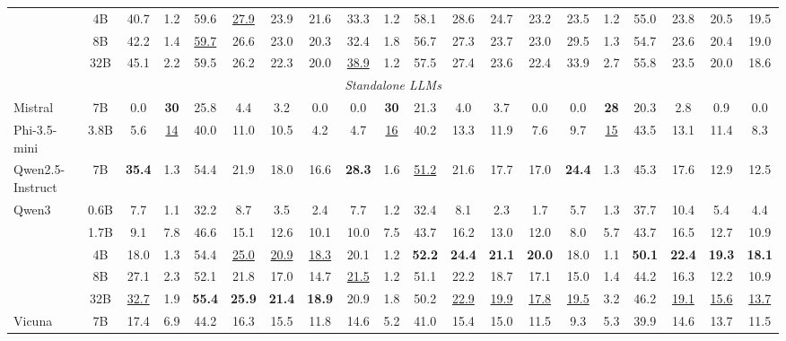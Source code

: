 \begin{table}[t]
{\begin{tabular}{lc|cccccc|cccccc|cccccc}
 & 4B & 40.7 & 1.2 & 59.6 & \underline{27.9} & 23.9 & 21.6 & 33.3 & 1.2 & 58.1 & 28.6 & 24.7 & 23.2 & 23.5 & 1.2 & 55.0 & 23.8 & 20.5 & 19.5 \\
 & 8B & 42.2 & 1.4 & \underline{59.7} & 26.6 & 23.0 & 20.3 & 32.4 & 1.8 & 56.7 & 27.3 & 23.7 & 23.0 & 29.5 & 1.3 & 54.7 & 23.6 & 20.4 & 19.0 \\
 & 32B & 45.1 & 2.2 & 59.5 & 26.2 & 22.3 & 20.0 & \underline{38.9} & 1.2 & 57.5 & 27.4 & 23.6 & 22.4 & 33.9 & 2.7 & 55.8 & 23.5 & 20.0 & 18.6 \\
\midrule
\multicolumn{20}{c}{\textit{Standalone LLMs}} \\
\midrule
Mistral & 7B & 0.0 & \textbf{30} & 25.8 & 4.4 & 3.2 & 0.0 & 0.0 & \textbf{30} & 21.3 & 4.0 & 3.7 & 0.0 & 0.0 & \textbf{28} & 20.3 & 2.8 & 0.9 & 0.0 \\
Phi-3.5-mini & 3.8B & 5.6 & \underline{14} & 40.0 & 11.0 & 10.5 & 4.2 & 4.7 & \underline{16} & 40.2 & 13.3 & 11.9 & 7.6 & 9.7 & \underline{15} & 43.5 & 13.1 & 11.4 & 8.3 \\
Qwen2.5-Instruct & 7B & \textbf{35.4} & 1.3 & 54.4 & 21.9 & 18.0 & 16.6 & \textbf{28.3} & 1.6 & \underline{51.2} & 21.6 & 17.7 & 17.0 & \textbf{24.4} & 1.3 & 45.3 & 17.6 & 12.9 & 12.5 \\
\multirow{5}{*}{Qwen3} & 0.6B & 7.7 & 1.1 & 32.2 & 8.7 & 3.5 & 2.4 & 7.7 & 1.2 & 32.4 & 8.1 & 2.3 & 1.7 & 5.7 & 1.3 & 37.7 & 10.4 & 5.4 & 4.4 \\
 & 1.7B & 9.1 & 7.8 & 46.6 & 15.1 & 12.6 & 10.1 & 10.0 & 7.5 & 43.7 & 16.2 & 13.0 & 12.0 & 8.0 & 5.7 & 43.7 & 16.5 & 12.7 & 10.9 \\
 & 4B & 18.0 & 1.3 & 54.4 & \underline{25.0} & \underline{20.9} & \underline{18.3} & 20.1 & 1.2 & \textbf{52.2} & \textbf{24.4} & \textbf{21.1} & \textbf{20.0} & 18.0 & 1.1 & \textbf{50.1} & \textbf{22.4} & \textbf{19.3} & \textbf{18.1} \\
 & 8B & 27.1 & 2.3 & 52.1 & 21.8 & 17.0 & 14.7 & \underline{21.5} & 1.2 & 51.1 & 22.2 & 18.7 & 17.1 & 15.0 & 1.4 & 44.2 & 16.3 & 12.2 & 10.9 \\
 & 32B & \underline{32.7} & 1.9 & \textbf{55.4} & \textbf{25.9} & \textbf{21.4} & \textbf{18.9} & 20.9 & 1.8 & 50.2 & \underline{22.9} & \underline{19.9} & \underline{17.8} & \underline{19.5} & 3.2 & 46.2 & \underline{19.1} & \underline{15.6} & \underline{13.7} \\
\multirow{2}{*}{Vicuna} & 7B & 17.4 & 6.9 & 44.2 & 16.3 & 15.5 & 11.8 & 14.6 & 5.2 & 41.0 & 15.4 & 15.0 & 11.5 & 9.3 & 5.3 & 39.9 & 14.6 & 13.7 & 11.5 \\

\end{tabular}}
\end{table}
